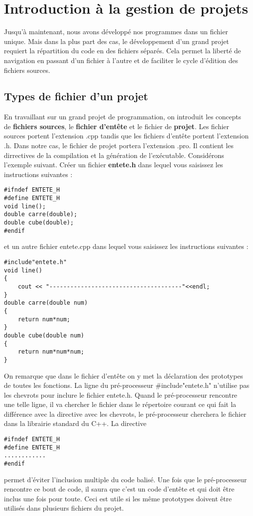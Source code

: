 \documentclass[a4paper, oneside,11pt]{book}
\begin{document}
\section{Introduction \`a la gestion de projets}
Jusqu'\`a maintenant, nous avons d\'evelopp\'e nos programmes dans un fichier unique. Mais dans la plus part des cas, le d\'eveloppement d'un grand projet requiert la r\'epartition 
du code en des fichiers s\'epar\'es. Cela permet la libert\'e de navigation en passant d'un fichier \`a l'autre et de faciliter le cycle d'\'edition des fichiers sources.
\subsection{Types de fichier d'un projet}
En travaillant sur un grand projet de programmation, on introduit les concepts 
de \textbf{fichiers sources}, le \textbf{fichier d'ent\^ete} et le fichier de 
\textbf{projet}. Les fichier sources portent l'extension .cpp tandis que les 
fichiers d'ent\^ete portent l'extension .h. Dans notre cas, le fichier de projet 
portera l'extension .pro. Il contient les dirrectives de la compilation et la 
g\'en\'eration de l'ex\'ecutable. Consid\'erons l'exemple suivant. 
Cr\'eer un fichier \textbf{entete.h} dans lequel vous saisissez les instructions
suivantes :

\begin{lstlisting}
#ifndef ENTETE_H
#define ENTETE_H
void line();
double carre(double);
double cube(double);
#endif
\end{lstlisting}
et un autre fichier entete.cpp dans lequel vous saisissez les instructions suivantes : 

\begin{lstlisting}
#include"entete.h"
void line()
{
    cout << "--------------------------------------"<<endl;
}
double carre(double num)
{
    return num*num;
}
double cube(double num)
{ 
    return num*num*num;
}
\end{lstlisting}
On remarque que dans le fichier d'ent\^ete on y met la d\'eclaration des 
prototypes de toutes les fonctions. La ligne du pr\'e-processeur \#include"entete.h" 
n'utilise pas les chevrots pour inclure le fichier entete.h. Quand le 
pr\'e-processeur rencontre une telle ligne, il va chercher le fichier dans le 
r\'epertoire courant ce qui fait la diff\'erence avec la directive avec les 
chevrots, le pr\'e-processeur cherchera le fichier dans la librairie 
standard du C++. La directive

\begin{lstlisting}
#ifndef ENTETE_H
#define ENTETE_H
............
#endif
\end{lstlisting}
permet d'\'eviter l'inclusion multiple du code balis\'e. Une fois que le pr\'e-processeur rencontre ce bout de code, il saura que c'est un code d'ent\^ete et qui doit \^etre 
inclus une fois pour toute. Ceci est utile si les m\^eme prototypes doivent \^etre utilis\'es dans plusieurs fichiers du projet.
\end{document}
